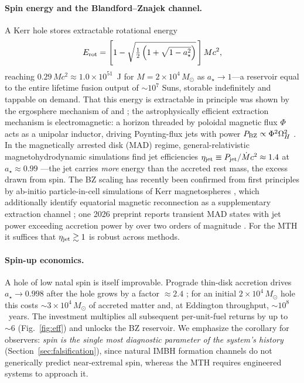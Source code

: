 \documentclass[11pt]{article}
\newcommand{\msun}{M_\odot}
\newcommand{\astar}{a_\star}
\begin{document}
\paragraph{Spin energy and the Blandford--Znajek channel.} A Kerr hole stores extractable rotational energy
\begin{equation}
E_{\rm rot} = \left[1 - \sqrt{\tfrac{1}{2}\left(1 + \sqrt{1 - \astar^{2}}\right)}\,\right] M c^{2},
\end{equation}
reaching $0.29\,Mc^{2} \approx 1.0\times10^{51}$~J for $M = 2\times10^{4}\,\msun$ as $\astar \to 1$---a reservoir equal to the entire lifetime fusion output of ${\sim}10^{7}$ Suns, storable indefinitely and tappable on demand. That this energy is extractable in principle was shown by the ergosphere mechanism of \citet{penrose1969} and \citet{penrose1971}; the astrophysically efficient extraction mechanism is electromagnetic: a horizon threaded by poloidal magnetic flux $\Phi$ acts as a unipolar inductor, driving Poynting-flux jets with power $P_{\rm BZ} \propto \Phi^{2}\Omega_H^{2}$ \citep{blandford1977}. In the magnetically arrested disk (MAD) regime, general-relativistic magnetohydrodynamic simulations find jet efficiencies $\eta_{\rm jet} \equiv P_{\rm jet}/\dot{M}c^{2} \approx 1.4$ at $\astar \approx 0.99$ \citep{tchekhovskoy2011,tchekhovskoy2015}---the jet carries \emph{more} energy than the accreted rest mass, the excess drawn from spin. The BZ scaling has recently been confirmed from first principles by ab-initio particle-in-cell simulations of Kerr magnetospheres \citep{meringolo2025}, which additionally identify equatorial magnetic reconnection as a supplementary extraction channel \citep{comisso2021,camilloni2025}; one 2026 preprint reports transient MAD states with jet power exceeding accretion power by over two orders of magnitude \citep[][not yet peer-reviewed]{nathanail2026}. For the MTH it suffices that $\eta_{\rm jet} \gtrsim 1$ is robust across methods.

\paragraph{Spin-up economics.} A hole of low natal spin is itself improvable. Prograde thin-disk accretion drives $\astar \to 0.998$ after the hole grows by a factor ${\approx}2.4$ \citep{thorne1974}; for an initial $2\times10^{4}\,\msun$ hole this costs ${\sim}3\times10^{4}\,\msun$ of accreted matter and, at Eddington throughput, ${\sim}10^{8}$~years. The investment multiplies all subsequent per-unit-fuel returns by up to ${\sim}6$ (Fig.~\ref{fig:eff}) and unlocks the BZ reservoir. We emphasize the corollary for observers: \emph{spin is the single most diagnostic parameter of the system's history} (Section~\ref{sec:falsification}), since natural IMBH formation channels do not generically predict near-extremal spin, whereas the MTH requires engineered systems to approach it.
\end{document}
